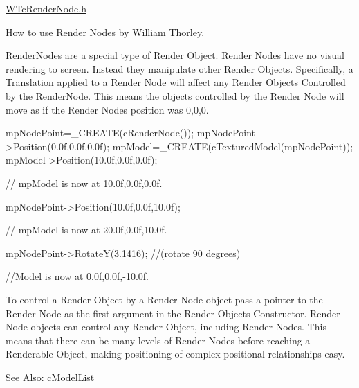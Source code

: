 \hyperlink{_w_tc_render_node_8h_source}{WTcRenderNode.h}

How to use Render Nodes by William Thorley.

RenderNodes are a special type of Render Object. Render Nodes have no visual rendering to screen. Instead they manipulate other Render Objects. Specifically, a Translation applied to a Render Node will affect any Render Objects Controlled by the RenderNode. This means the objects controlled by the Render Node will move as if the Render Nodes position was 0,0,0.


\begin{DoxyCode}
 mpNodePoint=_CREATE(cRenderNode());
 mpNodePoint->Position(0.0f,0.0f,0.0f);
 mpModel=_CREATE(cTexturedModel(mpNodePoint));
 mpModel->Position(10.0f,0.0f,0.0f);

 // mpModel is now at 10.0f,0.0f,0.0f.

 mpNodePoint->Position(10.0f,0.0f,10.0f);

 // mpModel is now at 20.0f,0.0f,10.0f.

 mpNodePoint->RotateY(3.1416); //(rotate 90 degrees)

 //Model is now at 0.0f,0.0f,-10.0f.
\end{DoxyCode}


To control a Render Object by a Render Node object pass a pointer to the Render Node as the first argument in the Render Objects Constructor. Render Node objects can control any Render Object, including Render Nodes. This means that there can be many levels of Render Nodes before reaching a Renderable Object, making positioning of complex positional relationships easy.

See Also: \hyperlink{classc_model_list}{cModelList} 